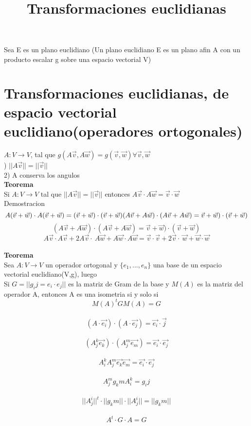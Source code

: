 \documentclass[12pt]{article}
\title{\textbf{Transformaciones euclidianas}}
\begin{document}
\date{}
\maketitle

Sea E es un plano euclidiano (Un plano euclidiano E es un plano afin A con un producto escalar g sobre una espacio vectorial V)

\section*{Transformaciones euclidianas, de espacio vectorial euclidiano(operadores ortogonales)}


$A:V \rightarrow V$, tal que $g(A\vec{v}, A\vec{w})=g(\vec{v}, \vec{w})  \forall \vec{v}, \vec{w}$\\

) $||A\vec{v}|| = ||\vec{v}||$\\
2) A conserva los angulos\\

\textbf{Teorema}\\
Si $A:V \rightarrow V$ tal que $||A\vec{v}|| = ||\vec{v}||$ entonces $A\vec{v} \cdot A\vec{w} = \vec{v} \cdot \vec{w}$\\

Demostracion\\

\begin{equation}
A(\vec{v} + \vec{w}) \cdot A(\vec{v} + \vec{w}) = (\vec{v} + \vec{w}) \cdot (\vec{v} + \vec{w})\\
(A\vec{v} + A\vec{w}) \cdot (A\vec{v} + A\vec{w}) = \vec{v} + \vec{w}) \cdot (\vec{v} + \vec{w})
\end{equation}
\begin{equation}
(A\vec{v} + A\vec{w}) \cdot (A\vec{v} + A\vec{w}) = \vec{v} + \vec{w}) \cdot (\vec{v} + \vec{w})
\end{equation}
\begin{equation}
A\vec{v} \cdot A\vec{v} + 2A\vec{v} \cdot\ A\vec{w} + A\vec{w} \cdot A\vec{w} = \vec{v} \cdot \vec{v} + 2\vec{v} \cdot\ \vec{w} + \vec{w} \cdot\vec{w} 
\end{equation}\\

\textbf{Teorema}\\

Sea $A:V \rightarrow V$ un operador ortogonal y  $ \{e_1, ... , e_n\}$ una base de un espacio vectorial euclidiano(V,g), luego \\
Si $G=||g_ij=e_i \cdot e_j||$  es la matriz de Gram de la base y $M(A)$ es la matriz del operador A, entonces A es una isometria si y solo si
$$M(A)^t GM(A) = G$$\\


$$(A\cdot\vec{e_i})\cdot (A\cdot\vec{e_j})= \vec{e_i}\cdot \vec{j} $$\\
$$(A^{k}_{j}\vec{e_k})\cdot(A^{m}_{j} \vec{e_m})=\vec{e_i}\cdot \vec{e_j}$$\\
$$A^{k}_{i}A^{m}_{j}\vec{e_k}\vec{e_m}=\vec{e_i}\cdot \vec{e_j}$$\\
$$A^{m}_{j}g_km A^{k}_{i}=g_ij$$\\
$$||A^{i}_{j}||^{t}\cdot ||g_km|| \cdot ||A^{i}_{j}|| = ||g_km||$$\\
$$ A^{t}\cdot G \cdot A = G $$
\end{document}
